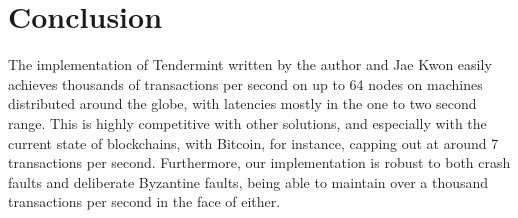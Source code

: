 \section{Conclusion}

The implementation of Tendermint written by the author and Jae Kwon easily achieves 
thousands of transactions per second on up to 64 nodes on machines distributed around the globe, 
with latencies mostly in the one to two second range.
This is highly competitive with other solutions, and especially with the current state of blockchains,
with Bitcoin, for instance, capping out at around 7 transactions per second.
Furthermore, our implementation is robust to both crash faults and deliberate Byzantine faults,
being able to maintain over a thousand transactions per second in the face of either.


